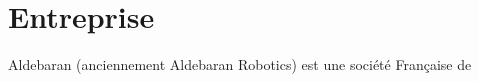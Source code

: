 \chapter*{Entreprise}
\thispagestyle{fancy}

Aldebaran (anciennement Aldebaran Robotics) est une société Française de